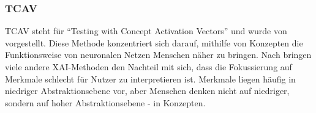 \subsubsection{TCAV}
TCAV steht für \enquote{Testing with Concept Activation Vectors} und wurde von \textcite{kim2018interpretability} vorgestellt. Diese Methode konzentriert sich darauf, mithilfe von Konzepten die Funktionsweise von neuronalen Netzen Menschen näher zu bringen. Nach \textcite{kim2018interpretability} bringen viele andere XAI-Methoden den Nachteil mit sich, dass die Fokussierung auf Merkmale schlecht für Nutzer zu interpretieren ist. Merkmale liegen häufig in niedriger Abstraktionsebene vor, aber Menschen denken nicht auf niedriger, sondern auf hoher Abstraktionsebene - in Konzepten. 


 
